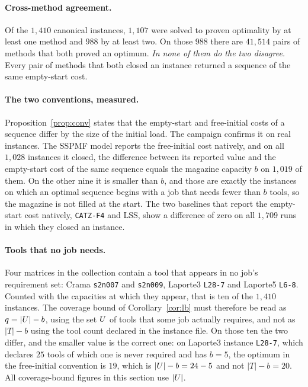 \paragraph{Cross-method agreement.}
Of the $1{,}410$ canonical instances, $1{,}107$ were solved to proven optimality by at least one
method and $988$ by at least two. On those $988$ there are $41{,}514$ pairs of methods
that both proved an optimum. \emph{In none of them do the two disagree.} Every pair of
methods that both closed an instance returned a sequence of the same empty-start cost.

\paragraph{The two conventions, measured.}
Proposition~\ref{prop:conv} states that the empty-start and free-initial costs of a
sequence differ by the size of the initial load. The campaign confirms it on real
instances. The SSPMF model reports the free-initial cost natively, and on all
$1{,}028$ instances it closed, the difference between its reported value and the
empty-start cost of the same sequence equals the magazine capacity $b$ on $1{,}019$ of
them. On the other nine it is smaller than $b$, and those are exactly the instances on
which an optimal sequence begins with a job that needs fewer than $b$ tools, so the
magazine is not filled at the start. The two baselines that report the empty-start cost
natively, \texttt{CATZ-F4} and LSS, show a difference of zero on all $1{,}709$ runs in
which they closed an instance.

\paragraph{Tools that no job needs.}
Four matrices in the collection contain a tool that appears in no job's requirement
set: Crama \texttt{s2n007} and \texttt{s2n009}, Laporte3 \texttt{L28-7} and Laporte5
\texttt{L6-8}. Counted with the capacities at which they appear, that is ten of the
$1{,}410$ instances. The coverage bound of Corollary~\ref{cor:lb} must therefore be read as
$q=\lvert U\rvert-b$, using the set $U$ of tools that some job actually requires, and
not as $\lvert T\rvert-b$ using the tool count declared in the instance file. On those
ten the two differ, and the smaller value is the correct one: on Laporte3
instance \texttt{L28-7}, which declares $25$ tools of which one is never required and
has $b=5$, the optimum in the free-initial convention is $19$, which is
$\lvert U\rvert-b=24-5$ and not $\lvert T\rvert-b=20$. All coverage-bound figures in
this section use $\lvert U\rvert$.

